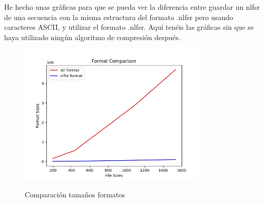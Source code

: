 He hecho unas gráficas para que se pueda ver la diferencia entre guardar un nlfsr de una secuencia con la misma estructura del formato .nlfsr pero usando caracteres ASCII, y utilizar el formato .nlfsr. Aquí tenéis las gráficas sin que se haya utilizado ningún algoritmo de compresión después. 
\begin{figure}[h] %
    \centering
    \includegraphics[width=0.8\textwidth,keepaspectratio]{img/format_comparison_graph.jpeg}
    \parbox{\linewidth}{\centering Comparación tamaños formatos}
    \label{fig:mi_imagen} 
\end{figure}
\newpage
